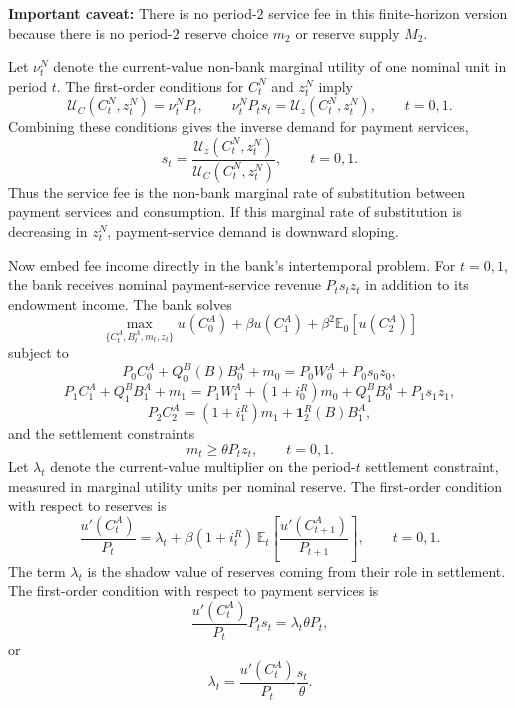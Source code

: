 \documentclass[12pt]{article}
\begin{document}
\textbf{Important caveat:} There is no period-$2$ service fee in this finite-horizon version because there is no period-$2$ reserve choice $m_2$ or reserve supply $M_2$.

Let $\nu^N_t$ denote the current-value non-bank marginal utility of one nominal unit in period $t$. The first-order conditions for $C^N_t$ and $z^N_t$ imply
\[
\mathcal{U}_C(C^N_t,z^N_t)
=
\nu^N_t P_t,
\qquad
\nu^N_t P_t s_t
=
\mathcal{U}_z(C^N_t,z^N_t),
\qquad t=0,1.
\]
Combining these conditions gives the inverse demand for payment services,
\[
s_t
=
\frac{\mathcal{U}_z(C^N_t,z^N_t)}
{\mathcal{U}_C(C^N_t,z^N_t)},
\qquad t=0,1.
\]
Thus the service fee is the non-bank marginal rate of substitution between payment services and consumption. If this marginal rate of substitution is decreasing in $z^N_t$, payment-service demand is downward sloping.

Now embed fee income directly in the bank's intertemporal problem. For $t=0,1$, the bank receives nominal payment-service revenue $P_t s_t z_t$ in addition to its endowment income. The bank solves
\[
\max_{\{C^A_t,B^A_t,m_t,z_t\}}
u(C^A_0)+\beta u(C^A_1)+\beta^2 \mathbb{E}_0[u(C^A_2)]
\]
subject to
\[
P_0 C^A_0 + Q^B_0(B)B^A_0 + m_0
=
P_0 W^A_0 + P_0 s_0 z_0,
\]
\[
P_1 C^A_1 + Q^B_1 B^A_1 + m_1
=
P_1 W^A_1 + (1+i^R_0)m_0 + Q^B_1 B^A_0 + P_1 s_1 z_1,
\]
\[
P_2 C^A_2
=
(1+i^R_1)m_1 + \mathbf{1}^{R}_2(B)B^A_1,
\]
and the settlement constraints
\[
m_t \ge \theta P_t z_t,
\qquad t=0,1.
\]
Let $\lambda_t$ denote the current-value multiplier on the period-$t$ settlement constraint, measured in marginal utility units per nominal reserve. The first-order condition with respect to reserves is
\[
\frac{u'(C^A_t)}{P_t}
=
\lambda_t
+ \beta(1+i^R_t)\,\mathbb{E}_t\!\left[\frac{u'(C^A_{t+1})}{P_{t+1}}\right],
\qquad t=0,1.
\]
The term $\lambda_t$ is the shadow value of reserves coming from their role in settlement. The first-order condition with respect to payment services is
\[
\frac{u'(C^A_t)}{P_t}P_t s_t
=
\lambda_t \theta P_t,
\]
or
\[
\lambda_t
=
\frac{u'(C^A_t)}{P_t}\frac{s_t}{\theta}.
\]
\end{document}
